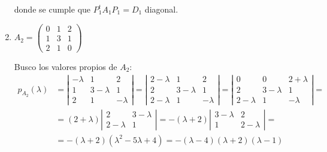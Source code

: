 \begin{ejercicio}
\begin{enumerate}
        donde se cumple que $P_1^tA_1P_1=D_1$ diagonal.




        \item $A_2 = \left(\begin{array}{ccc}
            0 & 1 & 2 \\
            1 & 3 & 1 \\
            2 & 1 & 0
        \end{array}\right)$

        Busco los valores propios de $A_2$:
        \begin{equation*}\begin{split}
            p_{A_2}(\lambda)&
            =\left|\begin{array}{ccc}
                -\lambda & 1 & 2 \\
                1 & 3-\lambda & 1 \\
                2 & 1 & -\lambda
            \end{array}\right|
            =\left|\begin{array}{ccc}
                2-\lambda & 1 & 2 \\
                2 & 3-\lambda & 1 \\
                2-\lambda & 1 & -\lambda
            \end{array}\right|
            =\left|\begin{array}{ccc}
                0 & 0 & 2+\lambda \\
                2 & 3-\lambda & 1 \\
                2-\lambda & 1 & -\lambda
            \end{array}\right| =\\
            & =(2+\lambda) \left|\begin{array}{cc}
                2 & 3-\lambda \\
                2-\lambda & 1
            \end{array}\right|
            = -(\lambda+2) \left|\begin{array}{cc}
                3-\lambda & 2\\
                1 & 2-\lambda
            \end{array}\right|
            =\\&= -(\lambda+2)(\lambda^2-5\lambda+4)
            = -(\lambda-4)(\lambda+2)(\lambda-1)
        \end{split}\end{equation*}


\end{enumerate}
\end{ejercicio}
